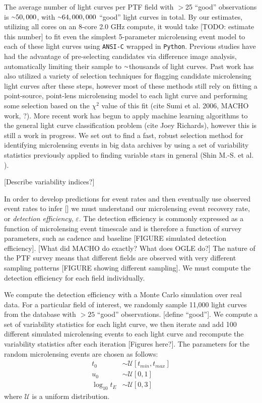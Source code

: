 \documentclass[12pt,preprint]{aastex}
\newcommand{\apwsim}{\raisebox{0.2ex}{\scriptsize$\sim$\normalsize}}
\newcommand{\inlinecode}{\texttt}
\begin{document}
The average number of light curves per PTF field with $>$25 ``good'' observations is $\apwsim 50,000$, with $\apwsim64,000,000$  ``good'' light curves in total. By our estimates, utilizing all cores on an 8-core 2.0 GHz compute, it would take [TODO: estimate this number] to fit even the simplest 5-parameter microlensing event model to each of these light curves using \inlinecode{ANSI-C} wrapped in \inlinecode{Python}. Previous studies have had the advantage of pre-selecting candidates via difference image analysis, automatically limiting their sample to $\apwsim$thousands of light curves. Past work has also utilized a variety of selection techniques for flagging candidate microlensing light curves after these steps, however most of these methods still rely on fitting a point-source, point-lens microlensing model to each light curve and performing some selection based on the $\chi^2$ value of this fit (cite Sumi et al. 2006, MACHO work, ?). More recent work has begun to apply machine learning algorithms to the general light curve classification problem (cite Joey Richards), however this is still a work in progress. We set out to find a fast, robust selection method for identifying microlensing events in big data archives by using a set of variability statistics previously applied to finding variable stars in general (Shin M.-S. et al. ).

[Describe variability indices?]

In order to develop predictions for event rates and then eventually use observed event rates to infer [] we must understand our microlensing event recovery rate, or \textit{detection efficiency}, $\varepsilon$. The detection efficiency is commonly expressed as a function of microlensing event timescale and is therefore a function of survey parameters, such as cadence and baseline [FIGURE simulated detection efficiency]. [What did MACHO do exactly? What does OGLE do?] The nature of the PTF survey means that different fields are observed with very different sampling patterns [FIGURE showing different sampling]. We must compute the detection efficiency for each field individually.

We compute the detection efficiency with a Monte Carlo simulation over real data. For a particular field of interest, we randomly sample 11,000 light curves from the database with $>25$ ``good'' observations. [define ``good'']. We compute a set of variability statistics for each light curve, we then iterate and add 100 different simulated microlensing events to each light curve and recompute the variability statistics after each iteration [Figures here?]. The parameters for the random microlensing events are chosen as follows: 
\begin{align}
	t_0&\sim\mathcal{U}[t_{min}, t_{max}] \\
	u_0&\sim\mathcal{U}[0, 1] \\
	\log_{10}t_E&\sim\mathcal{U}[0, 3] 
\end{align}
where $\mathcal{U}$ is a uniform distribution.
\end{document}
